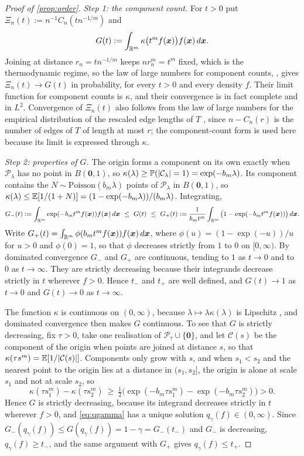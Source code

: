 \begin{proof}[Proof of \cref{prop:order}]
  \emph{Step 1: the component count.} For $t>0$ put $\Xi_n(t):=n^{-1}C_n(tn^{-1/m})$ and
  $$
  G(t):=\int_{\R^m}\kappa\big(t^mf(\bm{x})\big)f(\bm{x})\,d\bm{x}.
  $$
  Joining at distance $r_n=tn^{-1/m}$ keeps $nr_n^m=t^m$ fixed, which is the thermodynamic regime, so the law of large numbers for component counts, \citet[Theorem 3.13, an application of their Theorem 2.1]{MitschePenrose2021}, gives $\Xi_n(t)\to G(t)$ in probability, for every $t>0$ and every density $f$. Their limit function for component counts is $\kappa$, and their convergence is in fact complete and in $L^2$. Convergence of $\Xi_n(t)$ also follows from the law of large numbers for the empirical distribution of the rescaled edge lengths of $T$ \citep[Theorem 2.3(i), first obtained by \citealp{Penrose1996}]{PenroseYukich2003}, since $n-C_n(r)$ is the number of edges of $T$ of length at most $r$; the component-count form is used here because its limit is expressed through $\kappa$.

  \emph{Step 2: properties of $G$.} The origin forms a component on its own exactly when $\mathcal{P}_\lambda$ has no point in $B(\bm{0},1)$, so $\kappa(\lambda)\ge\P(|\mathcal{C}_\lambda|=1)=\exp(-b_m\lambda)$. Its component contains the $N\sim\text{Poisson}(b_m\lambda)$ points of $\mathcal{P}_\lambda$ in $B(\bm{0},1)$, so $\kappa(\lambda)\le\E[1/(1+N)]=(1-\exp(-b_m\lambda))/(b_m\lambda)$. Integrating,
  $$
  G_-(t):=\int_{\R^m}\exp(-b_mt^mf(\bm{x}))f(\bm{x})\,d\bm{x}\ \le\ G(t)\ \le\ G_+(t):=\frac{1}{b_mt^m}\int_{\R^m}\big(1-\exp(-b_mt^mf(\bm{x}))\big)\,d\bm{x}.
  $$
  Write $G_+(t)=\int_{\R^m}\phi(b_mt^mf(\bm{x}))f(\bm{x})\,d\bm{x}$, where $\phi(u)=(1-\exp(-u))/u$ for $u>0$ and $\phi(0)=1$, so that $\phi$ decreases strictly from $1$ to $0$ on $[0,\infty)$. By dominated convergence $G_-$ and $G_+$ are continuous, tending to $1$ as $t\to0$ and to $0$ as $t\to\infty$. They are strictly decreasing because their integrands decrease strictly in $t$ wherever $f>0$. Hence $t_-$ and $t_+$ are well defined, and $G(t)\to1$ as $t\to0$ and $G(t)\to0$ as $t\to\infty$.

  The function $\kappa$ is continuous on $(0,\infty)$, because $\lambda\mapsto\lambda\kappa(\lambda)$ is Lipschitz \citep[Proposition 2.3(ii) and Section 3.6]{MitschePenrose2021}, and dominated convergence then makes $G$ continuous. To see that $G$ is strictly decreasing, fix $\tau>0$, take one realisation of $\mathcal{P}_\tau\cup\{\bm{0}\}$, and let $\mathcal{C}(s)$ be the component of the origin when points are joined at distance $s$, so that $\kappa(\tau s^m)=\E[1/|\mathcal{C}(s)|]$. Components only grow with $s$, and when $s_1<s_2$ and the nearest point to the origin lies at a distance in $(s_1,s_2]$, the origin is alone at scale $s_1$ and not at scale $s_2$, so
  $$
  \kappa(\tau s_1^m)-\kappa(\tau s_2^m)\ \ge\ \tfrac12\big(\exp(-b_m\tau s_1^m)-\exp(-b_m\tau s_2^m)\big)>0.
  $$
  Hence $G$ is strictly decreasing, because its integrand decreases strictly in $t$ wherever $f>0$, and \eqref{eq:qgamma} has a unique solution $q_\gamma(f)\in(0,\infty)$. Since $G_-(q_\gamma(f))\le G(q_\gamma(f))=1-\gamma=G_-(t_-)$ and $G_-$ is decreasing, $q_\gamma(f)\ge t_-$, and the same argument with $G_+$ gives $q_\gamma(f)\le t_+$.


\end{proof}
